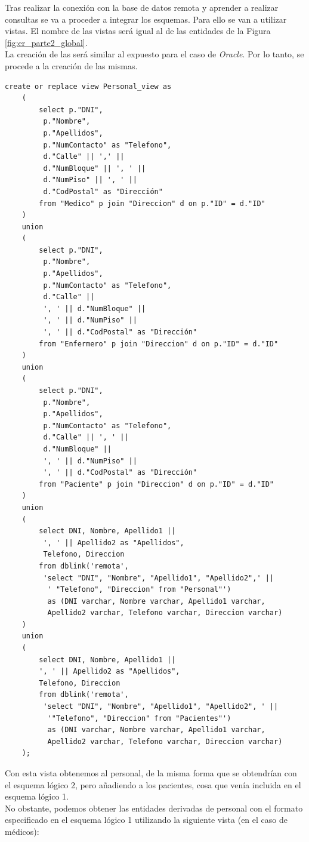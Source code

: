 \documentclass{article}
\begin{document}
Tras realizar la conexión con la base de datos remota y aprender a realizar consultas se va a proceder a integrar los esquemas. Para ello se van a utilizar vistas. El nombre de las vistas será igual al de las entidades de la Figura \ref{fig:er_parte2_global}.\\
La creación de las será similar al expuesto para el caso de \emph{Oracle}.
Por lo tanto, se procede a la creación de las mismas.

\begin{lstlisting}
create or replace view Personal_view as 
    (
        select p."DNI", 
         p."Nombre", 
         p."Apellidos", 
         p."NumContacto" as "Telefono", 
         d."Calle" || ',' || 
         d."NumBloque" || ', ' || 
         d."NumPiso" || ', ' || 
         d."CodPostal" as "Dirección"
        from "Medico" p join "Direccion" d on p."ID" = d."ID"
    )
    union
    (
        select p."DNI", 
         p."Nombre", 
         p."Apellidos", 
         p."NumContacto" as "Telefono", 
         d."Calle" || 
         ', ' || d."NumBloque" || 
         ', ' || d."NumPiso" || 
         ', ' || d."CodPostal" as "Dirección"
        from "Enfermero" p join "Direccion" d on p."ID" = d."ID"
    )
    union
    (
        select p."DNI",
         p."Nombre",
         p."Apellidos",
         p."NumContacto" as "Telefono",
         d."Calle" || ', ' ||
         d."NumBloque" ||
         ', ' || d."NumPiso" ||
         ', ' || d."CodPostal" as "Dirección"
        from "Paciente" p join "Direccion" d on p."ID" = d."ID"
    )
    union
    (
        select DNI, Nombre, Apellido1 || 
         ', ' || Apellido2 as "Apellidos", 
         Telefono, Direccion
		from dblink('remota',
		 'select "DNI", "Nombre", "Apellido1", "Apellido2",' ||
		  ' "Telefono", "Direccion" from "Personal"') 
		  as (DNI varchar, Nombre varchar, Apellido1 varchar, 
		  Apellido2 varchar, Telefono varchar, Direccion varchar)
    )
    union
    (
        select DNI, Nombre, Apellido1 || 
        ', ' || Apellido2 as "Apellidos", 
        Telefono, Direccion
		from dblink('remota', 
		 'select "DNI", "Nombre", "Apellido1", "Apellido2", ' || 
		  '"Telefono", "Direccion" from "Pacientes"') 
		  as (DNI varchar, Nombre varchar, Apellido1 varchar,
		  Apellido2 varchar, Telefono varchar, Direccion varchar)
    );
\end{lstlisting}


Con esta vista obtenemos al personal, de la misma forma que se obtendrían con el esquema lógico 2, pero añadiendo a los pacientes, cosa que venía incluida en el esquema lógico 1.\\
No obstante, podemos obtener las entidades derivadas de personal con el formato especificado en el esquema lógico 1 utilizando la siguiente vista (en el caso de médicos):
\end{document}
